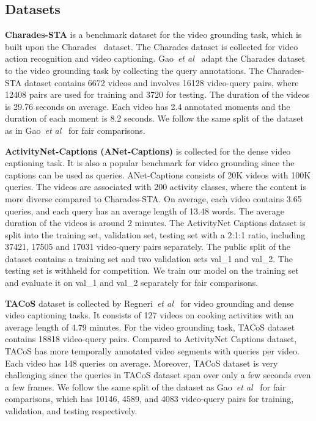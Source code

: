 \documentclass[10pt,twocolumn,letterpaper]{article}
\def\etal{\emph{et al}\onedot}
\begin{document}
	\subsection{Datasets}


	\noindent \textbf{Charades-STA} is a benchmark dataset for the video grounding task, which is built upon the Charades~\cite{sigurdsson2016hollywood} dataset. 
	The Charades dataset is collected for video action recognition and video captioning. 
    Gao~\etal~\cite{gao2017tall} adapt the Charades dataset to the video grounding task by collecting the query annotations. The Charades-STA dataset contains 6672 videos and involves 16128 video-query pairs, where 12408 pairs are used for training and 3720 for testing.  The duration of the videos is 29.76 seconds on average. Each video has 2.4 annotated moments and the duration of each moment is 8.2 seconds. We follow the same split of the dataset as in Gao~\etal~\cite{gao2017tall} for fair comparisons.
	
	\noindent \textbf{ActivityNet-Captions (ANet-Captions)} is collected for the dense video captioning task. It is also a popular benchmark for video grounding since the captions can be used as queries. ANet-Captions consists of 20K videos with 100K queries. 
	The videos are associated with 200 activity classes, where the content is more diverse compared to Charades-STA. 
On average, each video contains 3.65 queries, and each query has an average length of 13.48 words. The average duration of the videos is around 2 minutes. The ActivityNet Captions dataset is split into the training set, validation set, testing set with a 2:1:1 ratio, including 37421, 17505 and 17031 video-query pairs separately. The public split of the dataset contains a training set and two validation sets val\_1 and val\_2. The testing set is withheld for competition. We train our model on the training set and evaluate it on val\_1 and val\_2 separately for fair comparisons. 
	
	\noindent \textbf{TACoS} dataset is collected by Regneri~\etal~\cite{regneri2013grounding} for video grounding and dense video captioning tasks. It consists of 127 videos on cooking activities with an average length of 4.79 minutes. For the video grounding task, TACoS dataset contains 18818 video-query pairs. 
	Compared to ActivityNet Captions dataset, TACoS has more temporally annotated video segments with queries per video. 
	Each video has 148 queries on average. Moreover, TACoS dataset is very challenging since the queries in TACoS dataset span over only a few seconds even a few frames. We follow the same split of the dataset as Gao~\etal~\cite{gao2017tall} for fair comparisons, which has 10146, 4589, and 4083 video-query pairs for training, validation, and testing respectively.
	
\end{document}
